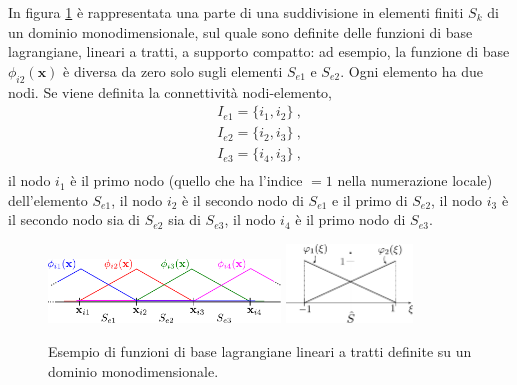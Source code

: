  In figura \ref{fig:base-fcn} è rappresentata una parte di una suddivisione in elementi finiti $S_{k}$ di un dominio monodimensionale, sul quale sono definite delle funzioni di base lagrangiane, lineari a tratti, a supporto compatto: ad esempio, la funzione di base $\phi_{i2}(\bm{x})$ è diversa da zero solo sugli elementi $S_{e1}$ e $S_{e2}$.
 Ogni elemento ha due nodi. Se viene definita la connettività nodi-elemento, 
\begin{equation}\label{eqn:conn:ex}
  \begin{aligned}
    I_{e1} = \{ i_1 , i_2 \} \ , \\
    I_{e2} = \{ i_2 , i_3 \} \ , \\
    I_{e3} = \{ i_4 , i_3 \} \ , \\
  \end{aligned}
\end{equation}
il nodo $i_1$ è il primo nodo (quello che ha l'indice $=1$ nella numerazione locale) dell'elemento $S_{e1}$, il nodo $i_2$ è il secondo nodo di $S_{e1}$ e il primo di $S_{e2}$, il nodo $i_3$ è il secondo nodo sia di $S_{e2}$ sia di $S_{e3}$, il nodo $i_4$ è il primo nodo di $S_{e3}$.

%
\begin{figure}[t]
 \centering
 \includegraphics[width=0.55\textwidth,trim=0 0 0 0]{./fig/base-functions} \hspace{20pt}
 \includegraphics[width=0.30\textwidth,trim=0 0 0 0]{./fig/base-functions-ref}
\caption{Esempio di funzioni di base lagrangiane lineari a tratti definite su un dominio monodimensionale.}\label{fig:base-fcn}
\end{figure}
%
 
